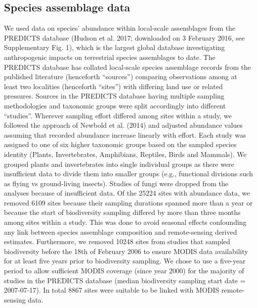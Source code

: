 {\subsection{Species assemblage data}
We used data on species’ abundance within local-scale assemblages from the PREDICTS database (Hudson et al. 2017; downloaded on 3 February 2016, see Supplementary Fig. 1), which is the largest global database investigating anthropogenic impacts on terrestrial species assemblages to date. The PREDICTS database has collated local-scale species assemblage records from the published literature (henceforth “sources”) comparing observations among at least two localities (henceforth “sites”) with differing land use or related pressures. Sources in the PREDICTS database having multiple sampling methodologies and taxonomic groups were split accordingly into different “studies”. Wherever sampling effort differed among sites within a study, we followed the approach of Newbold et al. (2014) and adjusted abundance values assuming that recorded abundance increase linearly with effort. Each study was assigned to one of six higher taxonomic groups based on the sampled species identity (Plants, Invertebrates, Amphibians, Reptiles, Birds and Mammals). We grouped plants and invertebrates into single individual groups as there were insufficient data to divide them into smaller groups (e.g., functional divisions such as flying vs ground-living insects). Studies of fungi were dropped from the analyses because of insufficient data.
	Of the 25224 sites with abundance data, we removed 6109 sites because their sampling durations spanned more than a year or because the start of biodiversity sampling differed by more than three months among sites within a study. This was done to avoid seasonal effects confounding any link between species assemblage composition and remote-sensing derived estimates. Furthermore, we removed 10248 sites from studies that sampled biodiversity before the 18th of February 2006 to ensure MODIS data availability for at least five years prior to biodiversity sampling. We chose to use a five-year period to allow sufficient MODIS coverage (since year 2000) for the majority of studies in the PREDICTS database (median biodiversity sampling start date = 2007-07-17). In total 8867 sites were suitable to be linked with MODIS remote-sensing data.
}
